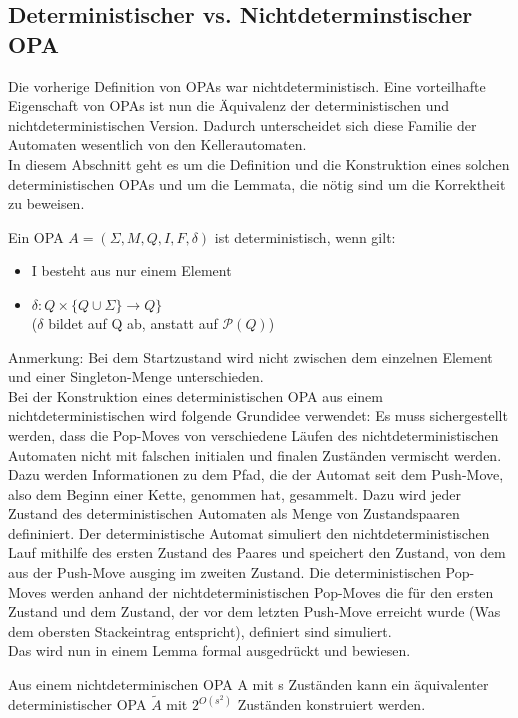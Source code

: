 \subsection{Deterministischer vs. Nichtdeterminstischer OPA}
Die vorherige Definition von OPAs war nichtdeterministisch. Eine vorteilhafte Eigenschaft von OPAs ist nun die Äquivalenz der deterministischen und nichtdeterministischen Version. Dadurch unterscheidet sich diese Familie der Automaten wesentlich von den Kellerautomaten. \\
In diesem Abschnitt geht es um die Definition und die Konstruktion eines solchen deterministischen OPAs und um die Lemmata, die nötig sind um die Korrektheit zu beweisen.
\begin{definition}
Ein OPA $A=(\Sigma, M, Q, I, F, \delta)$ ist deterministisch, wenn gilt:
\begin{itemize}
\item
I besteht aus nur einem Element 
\item
$\delta: Q \times \{Q \cup \Sigma\} \rightarrow Q\}$ \\
($\delta$ bildet auf Q ab, anstatt auf $\mathcal{P}(Q)$)
\end{itemize}
\end{definition}
Anmerkung: Bei dem Startzustand wird nicht zwischen dem einzelnen Element und einer Singleton-Menge unterschieden.\\
Bei der Konstruktion eines deterministischen OPA aus einem nichtdeterministischen wird folgende Grundidee verwendet: Es muss sichergestellt werden, dass die Pop-Moves von verschiedene Läufen des nichtdeterministischen Automaten nicht mit falschen initialen und finalen Zuständen vermischt werden. Dazu werden Informationen zu dem Pfad, die der Automat seit dem Push-Move, also dem Beginn einer Kette, genommen hat, gesammelt. Dazu wird jeder Zustand des deterministischen Automaten als Menge von Zustandspaaren defininiert. Der deterministische Automat simuliert den nichtdeterministischen Lauf mithilfe des ersten Zustand des Paares und speichert den Zustand, von dem aus der Push-Move ausging im zweiten Zustand. Die deterministischen Pop-Moves werden anhand  der nichtdeterministischen Pop-Moves die für den ersten Zustand und dem Zustand, der vor dem letzten Push-Move erreicht wurde (Was dem obersten Stackeintrag entspricht), definiert sind simuliert.\\
Das wird nun in einem Lemma formal ausgedrückt und bewiesen.
\begin{lemma}
\label{lemma_Deter}
Aus einem nichtdeterminischen OPA A mit s Zuständen kann ein äquivalenter deterministischer OPA $\tilde{A}$ mit $2^{O(s^2)}$ Zuständen konstruiert werden.
\end{lemma}
